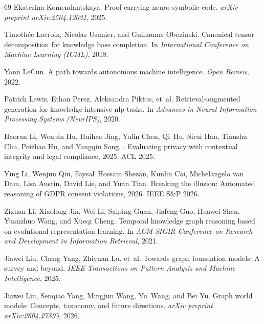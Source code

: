 \documentclass[11pt]{article}
\theoremstyle{plain}
\begin{document}
{\begin{thebibliography}{69}
Ekaterina Komendantskaya.
\newblock Proof-carrying neuro-symbolic code.
\newblock \emph{arXiv preprint arXiv:2504.12031}, 2025.

Timoth{\'e}e Lacroix, Nicolas Usunier, and Guillaume Obozinski.
\newblock Canonical tensor decomposition for knowledge base completion.
\newblock In \emph{International Conference on Machine Learning (ICML)}, 2018.

Yann LeCun.
\newblock A path towards autonomous machine intelligence.
\newblock \emph{Open Review}, 2022.

Patrick Lewis, Ethan Perez, Aleksandra Piktus, et~al.
\newblock Retrieval-augmented generation for knowledge-intensive nlp tasks.
\newblock In \emph{Advances in Neural Information Processing Systems
  (NeurIPS)}, 2020.

Haoran Li, Wenbin Hu, Huihao Jing, Yulin Chen, Qi~Hu, Sirui Han, Tianshu Chu,
  Peizhao Hu, and Yangqiu Song.
: Evaluating privacy with contextual integrity and
  legal compliance, 2025.
\newblock ACL 2025.

Ying Li, Wenjun Qiu, Faysal~Hossain Shezan, Kunlin Cai, Michelangelo van Dam,
  Lisa Austin, David Lie, and Yuan Tian.
\newblock Breaking the illusion: Automated reasoning of {GDPR} consent
  violations, 2026.
\newblock IEEE S\&P 2026.

Zixuan Li, Xiaolong Jin, Wei Li, Saiping Guan, Jiafeng Guo, Huawei Shen,
  Yuanzhuo Wang, and Xueqi Cheng.
\newblock Temporal knowledge graph reasoning based on evolutional
  representation learning.
\newblock In \emph{ACM SIGIR Conference on Research and Development in
  Information Retrieval}, 2021.

Jiawei Liu, Cheng Yang, Zhiyuan Lu, et~al.
\newblock Towards graph foundation models: A survey and beyond.
\newblock \emph{IEEE Transactions on Pattern Analysis and Machine
  Intelligence}, 2025.

Jiawei Liu, Senqiao Yang, Mingjun Wang, Yu~Wang, and Bei Yu.
\newblock Graph world models: Concepts, taxonomy, and future directions.
\newblock \emph{arXiv preprint arXiv:2604.27895}, 2026.


\end{thebibliography}}
\end{document}
